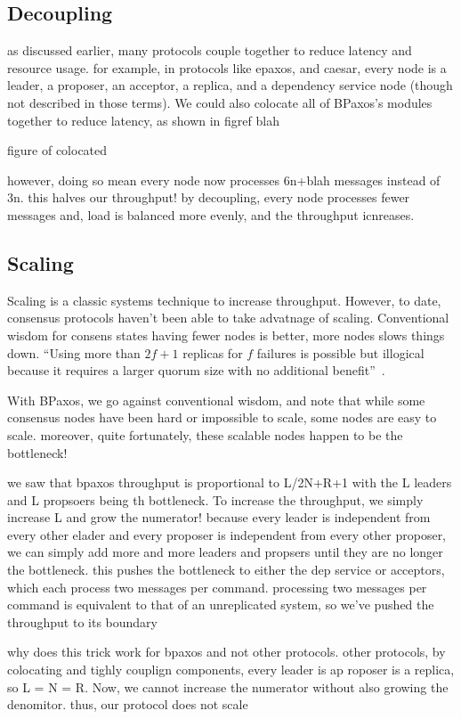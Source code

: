 \subsection{Decoupling}
as discussed earlier, many protocols couple together to reduce latency and resource usage. for example, in protocols like epaxos, and caesar, every node is a leader, a proposer, an acceptor, a replica, and a dependency service node (though not described in those terms). We could also colocate all of BPaxos's modules together to reduce latency, as shown in figref blah

figure of colocated

however, doing so mean every node now processes 6n+blah messages instead of 3n. this halves our throughput! by decoupling, every node processes fewer messages and, load is balanced more evenly, and the throughput icnreases.

\subsection{Scaling}
Scaling is a classic systems technique to increase
throughput. However, to date, consensus protocols haven't been able to take
advatnage of scaling. Conventional wisdom for consens states having fewer nodes
is better, more nodes slows things down. ``Using more than $2f+1$ replicas for
$f$ failures is possible but illogical because it requires a larger quorum size
with no additional benefit''~\cite{zhang2018building}.

With BPaxos, we go against conventional wisdom, and note that while some consensus nodes have been hard or impossible to scale, some nodes are easy to scale. moreover, quite fortunately, these scalable nodes happen to be the bottleneck!

we saw that bpaxos throughput is proportional to L/2N+R+1 with the L leaders and L propsoers being th bottleneck. To increase the throughput, we simply increase L and grow the numerator! because every leader is independent from every other elader and every proposer is independent from every other proposer, we can simply add more and more leaders and propsers until they are no longer the bottleneck. this pushes the bottleneck to either the dep service or acceptors, which each process two messages per command. processing two messages per command is equivalent to that of an unreplicated system, so we've pushed the throughput to its boundary

why does this trick work for bpaxos and not other protocols. other protocols, by colocating and tighly couplign components, every leader is ap roposer is a replica, so L = N = R. Now, we cannot increase the numerator without also growing the denomitor. thus, our protocol does not scale
